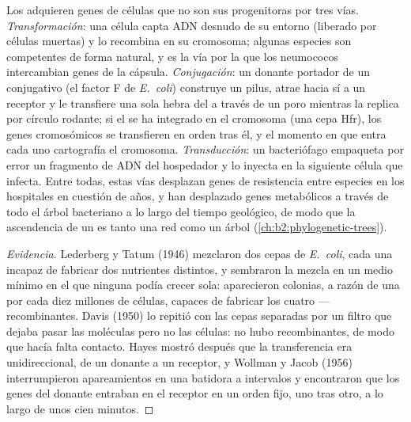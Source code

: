 \begin{definition}\label{def:b2:genome-diversification:hgt}
Los  adquieren genes de células que no son sus progenitoras
por tres vías. \emph{Transformación}: una célula capta ADN desnudo de su
entorno (liberado por células muertas) y lo recombina en su cromosoma;
algunas especies son competentes de forma natural, y es la vía por la que
los neumococos intercambian genes de la cápsula. \emph{Conjugación}: un
donante portador de un  conjugativo (el factor F de
\emph{E.~coli}) construye un pilus, atrae hacia sí a un receptor y le
transfiere una sola hebra del  a través de un poro mientras la
replica por círculo rodante; si el  se ha integrado en el
cromosoma (una cepa Hfr), los genes cromosómicos se transfieren en orden
tras él, y el momento en que entra cada uno cartografía el cromosoma.
\emph{Transducción}: un bacteriófago empaqueta por error un fragmento de
ADN del hospedador y lo inyecta en la siguiente célula que infecta. Entre
todas, estas vías desplazan genes de resistencia entre especies en los
hospitales en cuestión de años, y han desplazado genes metabólicos a
través de todo el árbol bacteriano a lo largo del tiempo geológico, de
modo que la ascendencia de un  es tanto una red como un árbol
(\cref{ch:b2:phylogenetic-trees}).
\end{definition}
\begin{proof}[Evidencia]
Lederberg y Tatum (1946) mezclaron dos cepas de \emph{E.~coli}, cada una
incapaz de fabricar dos nutrientes distintos, y sembraron la mezcla en un
medio mínimo en el que ninguna podía crecer sola: aparecieron colonias,
a razón de una por cada diez millones de células, capaces de fabricar
los cuatro --- recombinantes. Davis (1950) lo repitió con las cepas
separadas por un filtro que dejaba pasar las moléculas pero no las
células: no hubo recombinantes, de modo que hacía falta contacto. Hayes
mostró después que la transferencia era unidireccional, de un donante a
un receptor, y Wollman y Jacob (1956) interrumpieron apareamientos en una
batidora a intervalos y encontraron que los genes del donante entraban
en el receptor en un orden fijo, uno tras otro, a lo largo de unos cien
minutos.
\end{proof}

